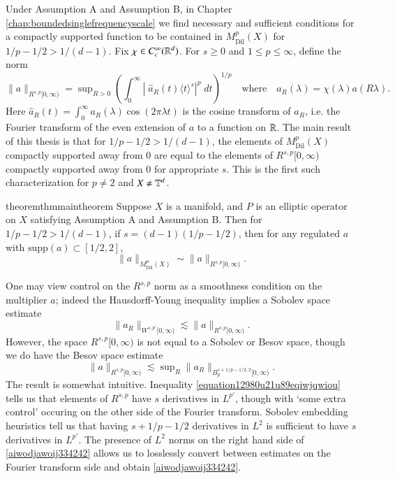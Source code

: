 Under Assumption A and Assumption B, in Chapter \ref{chap:boundedsinglefrequencyscale} we find necessary and sufficient conditions for a compactly supported function to be contained in $M^p_{\text{Dil}}(X)$ for $1/p - 1/2 > 1/(d-1)$. Fix $\chi \in C_c^\infty(\operatorname{\mathbb{R}}^d)$. For $s \geq 0$ and $1 \leq p \leq \infty$, define the norm
%
\begin{equation}
  \| a \|_{R^{s,p}[0,\infty)} = \sup\nolimits_{R > 0} \left( \int_0^\infty \left|\;\! \widehat{a}_R(t) \langle t \rangle^s \right|^p\; dt \right)^{1/p} \quad\text{where}\quad a_R(\lambda) = \chi(\lambda) a(R \lambda).
\end{equation}
%
Here $\widehat{a}_R(t) = \int_0^\infty a_R(\lambda) \cos(2 \pi \lambda t)$ is the cosine transform of $a_R$, i.e. the Fourier transform of the even extension of $a$ to a function on $\operatorname{\mathbb{R}}$. The main result of this thesis is that for $1/p - 1/2 > 1/(d-1)$, the elements of $M^p_{\text{Dil}}(X)$ compactly supported away from $0$ are equal to the elements of $R^{s,p}[0,\infty)$ compactly supported away from $0$ for appropriate $s$. This is the first such characterization for $p \neq 2$ and $X \neq \operatorname{\mathbb{T}}^d$.

\begin{restatable}{theorem}{thmmaintheorem} \label{maintheorem}
  Suppose $X$ is a manifold, and $P$ is an elliptic operator on $X$ satisfying Assumption A and Assumption B. Then for $1/p - 1/2 > 1/(d-1)$, if $s = (d-1)(1/p - 1/2)$, then for any regulated $a$ with $\text{supp}(a) \subset [1/2,2]$,
  \[ \| a \|_{M^p_{\text{Dil}}(X)} \sim \| a \|_{R^{s,p}[0,\infty)}. \]
\end{restatable}

One may view control on the $R^{s,p}$ norm as a smoothness condition on the multiplier $a$; indeed the Hausdorff-Young inequality implies a Sobolev space estimate
%
\begin{equation} \label{equation12980u21u89eqiwjqwiou}
  \| a_R \|_{W^{s,p'}[0,\infty)} \lesssim \| a \|_{R^{s,p}[0,\infty)}.
\end{equation}
%
However, the space $R^{s,p}[0,\infty)$ is not equal to a Sobolev or Besov space, though we do have the Besov space estimate
%
\begin{equation} \label{aiwodjawoij334242}
  \| a \|_{R^{s,p}[0,\infty)} \lesssim \sup\nolimits_R \| a_R \|_{B^{s+1/p - 1/2,2}_p[0,\infty)}.
\end{equation}
%
The result is somewhat intuitive. Inequality \eqref{equation12980u21u89eqiwjqwiou} tells us that elements of $R^{s,p}$ have $s$ derivatives in $L^{p'}$, though with `some extra control' occuring on the other side of the Fourier transform. Sobolev embedding heuristics tell us that having $s + 1/p - 1/2$ derivatives in $L^2$ is sufficient to have $s$ derivatives in $L^{p'}$. The presence of $L^2$ norms on the right hand side of \eqref{aiwodjawoij334242} allows us to losslessly convert between estimates on the Fourier transform side and obtain \eqref{aiwodjawoij334242}.

